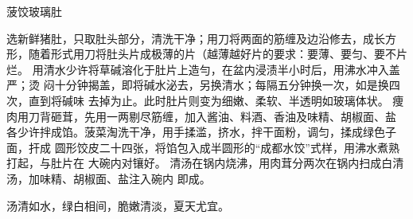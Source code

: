 \begin{recipe}{菠饺玻璃肚}

\ingredients


\cooking

\step 选新鲜猪肚，只取肚头部分，清洗干净；用刀将两面的筋缠及边沿修去，成长方
形，随着形式用刀将肚头片成极薄的片（越薄越好片的要求：要薄、要匀、要不片烂。
\step 用清水少许将草碱溶化于肚片上造勻，在盆内浸渍半小时后，用沸水冲入盖严；烫
闷十分钟揭盖，即将碱水泌去，另换清水；每隔五分钟换一次，如是换四次，直到将碱味
去掉为止。此时肚片则变为细嫩、柔软、半透明如玻璃体状。
\step 痩肉用刀背砸茸，先用一两剔尽筋缠，加入酱油、料酒、香油及味精、胡椒面、盐
各少许拌成馅。菠菜淘洗干净，用手揉滥，挤水，拌干面粉，调匀，揉成绿色子面，扞成
圆形饺皮二十四张，将馅包入成半圆形的“成都水饺”式样，用沸水煮熟打起，与肚片在
大碗内对镶好。
\step 清汤在锅内烧沸，用肉茸分两次在锅内扫成白清汤，加味精、胡椒面、盐注入碗内
即成。

\notes

汤清如水，绿白相间，脆嫩清淡，夏天尤宜。

\end{recipe}

